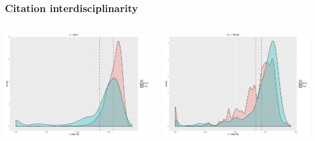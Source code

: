 \begin{frame}
\frametitle{Citation interdisciplinarity}
\begin{columns}
\begin{column}{0.5\textwidth}
\includegraphics[width=\textwidth]{figures/citin_interdisc}
\end{column}
\begin{column}{0.5\textwidth}
\includegraphics[width=\textwidth]{figures/citout_interdisc}
\end{column}
\end{columns}
\end{frame}




